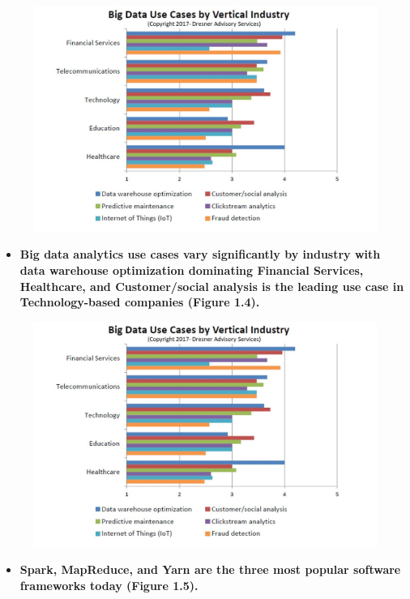 \documentclass[]{book}
\providecommand{\tightlist}{%
  \setlength{\itemsep}{0pt}\setlength{\parskip}{0pt}}
\begin{document}
\begin{figure}
\centering
\includegraphics{3.jpg}
\caption{}
\end{figure}

\begin{itemize}
\tightlist
\item
  \textbf{Big data analytics use cases vary significantly by industry
  with data warehouse optimization dominating Financial Services,
  Healthcare, and Customer/social analysis is the leading use case in
  Technology-based companies (Figure 1.4).}
\end{itemize}

\begin{figure}
\centering
\includegraphics{4.jpg}
\caption{}
\end{figure}

\begin{itemize}
\tightlist
\item
  \textbf{Spark, MapReduce, and Yarn are the three most popular software
  frameworks today (Figure 1.5).}
\end{itemize}
\end{document}
